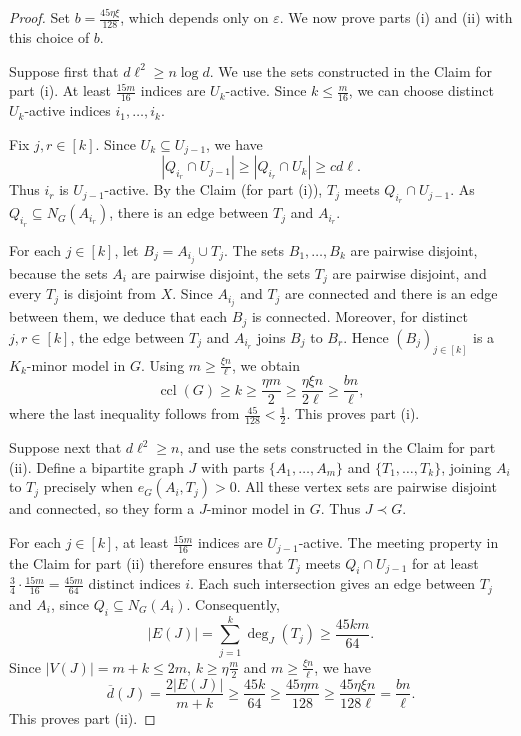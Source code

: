 \documentclass[10pt,a4paper]{amsart}
\DeclareMathOperator{\ccl}{ccl}
\newcommand{\eps}{\varepsilon}
\begin{document}
\begin{proof}
Set $b=\frac{45\eta\xi}{128}$, which depends only on $\eps$.
We now prove parts (i) and (ii) with this choice of $b$.

Suppose first that $d\ell^2\ge n\log d$.  We use the sets constructed
in the  Claim for part (i). At least $\frac{15m}{16}$ indices are
$U_k$-active.  Since  $k\le\frac{m}{16}$, we can choose distinct
$U_k$-active indices $i_1,\ldots,i_k$.

Fix $j,r\in[k]$. Since $U_k\subseteq U_{j-1}$, we have
\[
 |Q_{i_r}\cap U_{j-1}|
 \ge |Q_{i_r}\cap U_k|
 \ge cd\ell.
\]
Thus $i_r$ is $U_{j-1}$-active. By the 
Claim (for part (i)), $T_j$ meets $Q_{i_r}\cap U_{j-1}$.
As $Q_{i_r}\subseteq N_G(A_{i_r})$, there is an edge between
$T_j$ and $A_{i_r}$.

For each $j\in[k]$, let $B_j=A_{i_j}\cup T_j$.
The sets $B_1,\ldots,B_k$ are pairwise disjoint, because the
sets $A_i$ are pairwise disjoint, the sets $T_j$ are pairwise
disjoint, and every $T_j$ is disjoint from $X$.
Since $A_{i_j}$ and $T_j$ are connected
and there is an edge between them, we deduce that each $B_j$ is connected. Moreover, for distinct
$j,r\in[k]$, the edge between $T_j$ and $A_{i_r}$ joins $B_j$
to $B_r$. Hence $(B_j)_{j\in[k]}$ is a $K_k$-minor model in $G$.
Using $m\ge\frac{\xi n}{\ell}$,
we obtain
\[
 \ccl(G)\ge k
 \ge\frac{\eta m}{2}
 \ge\frac{\eta\xi n}{2\ell}
 \ge\frac{bn}{\ell},
\]
where the last inequality follows from $\frac{45}{128}<\frac12$.
This proves part (i).

Suppose next that $d\ell^2\ge n$, and use the sets constructed in the
Claim for part (ii). Define a bipartite graph $J$ with parts
$\{A_1,\ldots,A_m\}$ and $\{T_1,\ldots,T_k\}$, joining $A_i$
to $T_j$ precisely when $e_G(A_i,T_j)>0$.
All these vertex sets are pairwise disjoint and connected, so
they form a $J$-minor model in $G$. Thus $J\prec G$.

For each $j\in[k]$, at least $\frac{15m}{16}$ indices are
$U_{j-1}$-active. The meeting property in the Claim for part (ii)
therefore ensures that $T_j$ meets $Q_i\cap U_{j-1}$ for at least
$\frac34\cdot\frac{15m}{16}=\frac{45m}{64}$ distinct indices $i$.
Each such intersection gives an edge between $T_j$ and $A_i$,
since $Q_i\subseteq N_G(A_i)$. Consequently,
\[
 |E(J)|=\sum_{j=1}^k\deg_J(T_j)
 \ge\frac{45km}{64}.
\]
Since $|V(J)|=m+k\le2m$, $k\ge \eta \frac{m}{2}$ and $m\ge \frac{\xi n}{\ell}$, we have
\[
 \overline d(J)
 =\frac{2|E(J)|}{m+k}
 \ge\frac{45k}{64}
 \ge\frac{45\eta m}{128}
 \ge\frac{45\eta\xi n}{128\ell}
 =\frac{bn}{\ell}.
\]
This proves part (ii).
\end{proof}
\end{document}
